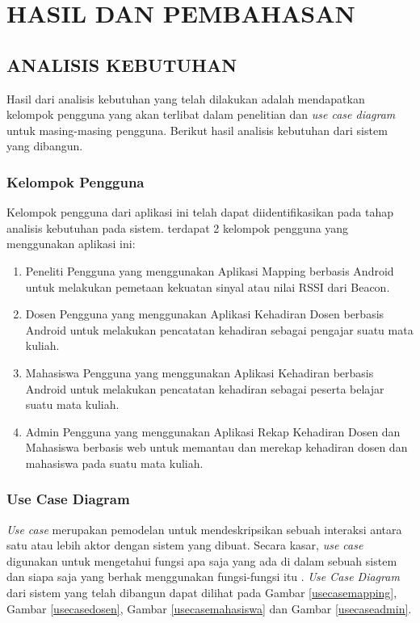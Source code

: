\fancyhf{} 
\fancyfoot[C]{\thepage}
\chapter{HASIL DAN PEMBAHASAN}
	\section{\uppercase{ANALISIS KEBUTUHAN}}
	
	Hasil dari analisis kebutuhan yang telah dilakukan adalah mendapatkan kelompok pengguna yang akan terlibat dalam penelitian dan \textit{use case diagram} untuk masing-masing pengguna. Berikut hasil analisis kebutuhan dari sistem yang dibangun.
	
	\subsection{Kelompok Pengguna}
	Kelompok pengguna dari aplikasi ini telah dapat diidentifikasikan pada tahap analisis kebutuhan pada sistem. terdapat 2 kelompok pengguna yang menggunakan aplikasi ini:
		 \begin{enumerate}[1.]
		 	\item Peneliti
		 		\newline Pengguna yang menggunakan Aplikasi Mapping berbasis Android untuk melakukan pemetaan kekuatan sinyal atau nilai RSSI dari Beacon. 
		 	\item Dosen
		 		\newline Pengguna yang menggunakan Aplikasi Kehadiran Dosen berbasis Android untuk melakukan pencatatan kehadiran sebagai pengajar suatu mata kuliah.
		 	\item Mahasiswa
		 		\newline Pengguna yang menggunakan Aplikasi Kehadiran berbasis Android untuk melakukan pencatatan kehadiran sebagai peserta belajar suatu mata kuliah.
		 	\item Admin
		 		\newline Pengguna yang menggunakan Aplikasi Rekap Kehadiran Dosen dan Mahasiswa berbasis web untuk memantau dan merekap kehadiran dosen dan mahasiswa pada suatu mata kuliah.
		 	\end{enumerate}
	
	\subsection{Use Case Diagram}
	\textit{Use case} merupakan pemodelan untuk mendeskripsikan sebuah interaksi antara satu atau lebih aktor dengan sistem yang dibuat. Secara kasar, \textit{use case} digunakan untuk mengetahui fungsi apa saja yang ada di dalam sebuah sistem dan siapa saja yang berhak menggunakan fungsi-fungsi itu \citep{Rosa2015}. \textit{Use Case Diagram} dari sistem yang telah dibangun dapat dilihat pada Gambar \ref{usecasemapping}, Gambar \ref{usecasedosen}, Gambar \ref{usecasemahasiswa} dan Gambar \ref{usecaseadmin}.
	
